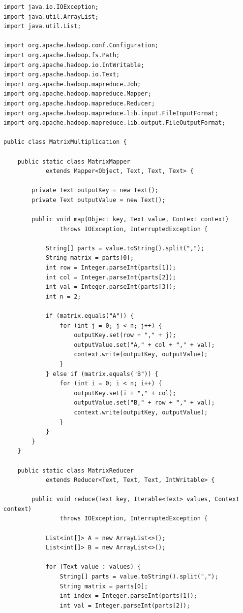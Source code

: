 \documentclass[11pt,a4paper]{article}
\begin{document}
\begin{lstlisting}[style=javastyle]
import java.io.IOException;
import java.util.ArrayList;
import java.util.List;

import org.apache.hadoop.conf.Configuration;
import org.apache.hadoop.fs.Path;
import org.apache.hadoop.io.IntWritable;
import org.apache.hadoop.io.Text;
import org.apache.hadoop.mapreduce.Job;
import org.apache.hadoop.mapreduce.Mapper;
import org.apache.hadoop.mapreduce.Reducer;
import org.apache.hadoop.mapreduce.lib.input.FileInputFormat;
import org.apache.hadoop.mapreduce.lib.output.FileOutputFormat;

public class MatrixMultiplication {

    public static class MatrixMapper
            extends Mapper<Object, Text, Text, Text> {

        private Text outputKey = new Text();
        private Text outputValue = new Text();

        public void map(Object key, Text value, Context context)
                throws IOException, InterruptedException {

            String[] parts = value.toString().split(",");
            String matrix = parts[0];
            int row = Integer.parseInt(parts[1]);
            int col = Integer.parseInt(parts[2]);
            int val = Integer.parseInt(parts[3]);
            int n = 2;

            if (matrix.equals("A")) {
                for (int j = 0; j < n; j++) {
                    outputKey.set(row + "," + j);
                    outputValue.set("A," + col + "," + val);
                    context.write(outputKey, outputValue);
                }
            } else if (matrix.equals("B")) {
                for (int i = 0; i < n; i++) {
                    outputKey.set(i + "," + col);
                    outputValue.set("B," + row + "," + val);
                    context.write(outputKey, outputValue);
                }
            }
        }
    }

    public static class MatrixReducer
            extends Reducer<Text, Text, Text, IntWritable> {

        public void reduce(Text key, Iterable<Text> values, Context context)
                throws IOException, InterruptedException {

            List<int[]> A = new ArrayList<>();
            List<int[]> B = new ArrayList<>();

            for (Text value : values) {
                String[] parts = value.toString().split(",");
                String matrix = parts[0];
                int index = Integer.parseInt(parts[1]);
                int val = Integer.parseInt(parts[2]);


\end{lstlisting}
\end{document}
